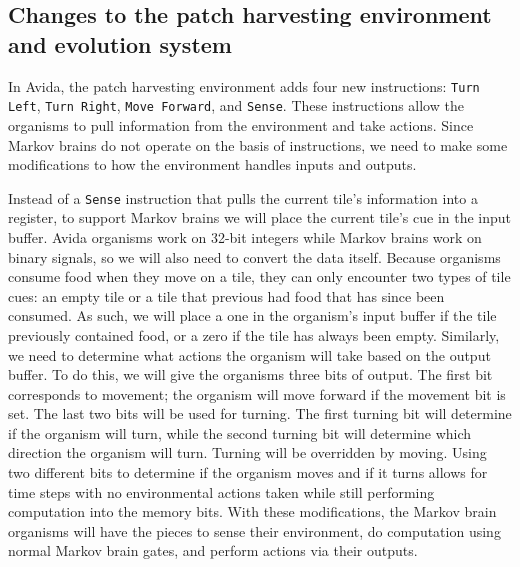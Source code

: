 \subsection{Changes to the patch harvesting environment and evolution system}

In Avida, the patch harvesting environment adds four new instructions: \texttt{Turn Left}, \texttt{Turn Right}, \texttt{Move Forward}, and \texttt{Sense}.
These instructions allow the organisms to pull information from the environment and take actions. 
Since Markov brains do not operate on the basis of instructions, we need to make some modifications to how the environment handles inputs and outputs. 

Instead of a \texttt{Sense} instruction that pulls the current tile's information into a register, to support Markov brains we will place the current tile's cue in the input buffer. 
Avida organisms work on 32-bit integers while Markov brains work on binary signals, so we will also need to convert the data itself. 
Because organisms consume food when they move on a tile, they can only encounter two types of tile cues: an empty tile or a tile that previous had food that has since been consumed. 
As such, we will place a one in the organism's input buffer if the tile previously contained food, or a zero if the tile has always been empty. 
Similarly, we need to determine what actions the organism will take based on the output buffer. 
To do this, we will give the organisms three bits of output. 
The first bit corresponds to movement; the organism will move forward if the movement bit is set. 
The last two bits will be used for turning. 
The first turning bit will determine if the organism will turn, while the second turning bit will determine which direction the organism will turn. 
Turning will be overridden by moving. 
Using two different bits to determine if the organism moves and if it turns allows for time steps with no environmental actions taken while still performing computation into the memory bits. 
With these modifications, the Markov brain organisms will have the pieces to sense their environment, do computation using normal Markov brain gates, and perform actions via their outputs. 

